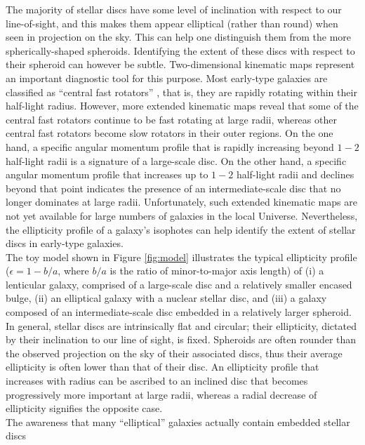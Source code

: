 \documentclass[useAMS,usenatbib,article]{mn2e}
\begin{document}
The majority of stellar discs have some level of inclination with respect to our line-of-sight, 
and this makes them appear elliptical (rather than round) when seen in projection on the sky. 
This can help one distinguish them from the more spherically-shaped spheroids. 
Identifying the extent of these discs with respect to their spheroid can however be subtle. 
Two-dimensional kinematic maps represent an important diagnostic tool for this purpose. 
Most early-type galaxies are classified as ``central fast rotators'' \citep{atlas3dIII-MNRAS}, 
that is, they are rapidly rotating within their half-light radius.  
However, more extended kinematic maps \citep{arnold2014} reveal that 
some of the central fast rotators continue to be fast rotating at large radii, 
whereas other central fast rotators become slow rotators in their outer regions.
On the one hand, a specific angular momentum profile that is rapidly increasing beyond $1-2$ half-light radii 
is a signature of a large-scale disc. 
On the other hand, a specific angular momentum profile that increases up to $1-2$ half-light radii and declines beyond that point 
indicates the presence of an intermediate-scale disc that no longer dominates at large radii. 
Unfortunately, such extended kinematic maps are not yet available for large numbers of galaxies in the local Universe. 
Nevertheless, the ellipticity profile of a galaxy's isophotes can help identify the extent of stellar discs in early-type galaxies. \\
The toy model shown in Figure \ref{fig:model} illustrates the typical ellipticity profile 
($\epsilon = 1 - b/a$, where $b/a$ is the ratio of minor-to-major axis length) of 
(i) a lenticular galaxy, comprised of a large-scale disc and a relatively smaller encased bulge, 
(ii) an elliptical galaxy with a nuclear stellar disc, 
and (iii) a galaxy composed of an intermediate-scale disc embedded in a relatively larger spheroid. 
In general, stellar discs are intrinsically flat and circular; 
their ellipticity, dictated by their inclination to our line of sight, is fixed. 
Spheroids are often rounder than the observed projection on the sky of their associated discs, 
thus their average ellipticity is often lower than that of their disc. 
An ellipticity profile that increases with radius can be ascribed to an inclined disc that becomes progressively more important at large radii, 
whereas a radial decrease of ellipticity signifies the opposite case. \\
The awareness that many ``elliptical'' galaxies actually contain embedded stellar discs 
\end{document}
